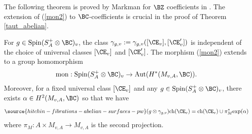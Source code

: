 The following theorem is  proved by Markman for $\BZ$ coefficients in \cite{Markman2,Markman3}.
The extension of (\ref{mon2}) to  $\BC$-coefficients is crucial in the proof of Theorem \ref{taut_abelian}.

\begin{thm}
\notready\label{monodromy_main}
For $g \in \mathrm{Spin}(S_A^+\otimes\BC)_v$,
the class $\gamma_{g,v}:= \gamma_{g,v}([\CE_v],[\CE'_v])$ is independent of the choice of universal classes $[\CE_v]$ and $[\CE'_v]$.
The morphism (\ref{mon2}) extends to a group homomorphism
\[
 \mathrm{mon}:  \mathrm{Spin}(S_A^+ \otimes \BC)_v \to \mathrm{Aut}(H^*(M_{v,A}, \BC)).
\]
 Moreover, for a fixed universal class $[\CE_v]$ and any $g \in \mathrm{Spin}(S_A^+ \otimes \BC)_v$, there exists
$\alpha \in H^2(M_{v,A}, \BC)$
so that we have
\begin{equation}\label{univ_fam}
\source{hitchin-fibrations-abelian-surfaces-pw}
(g\otimes \gamma_{g,v}) \mathrm{ch}(\CE_v) = \mathrm{ch}({\CE}_v)\cup \pi_M^* \mathrm{exp}(\alpha)
\end{equation}
where $\pi_M: A\times M_{v,A} \to M_{v,A}$ is the second projection.
\end{thm}

